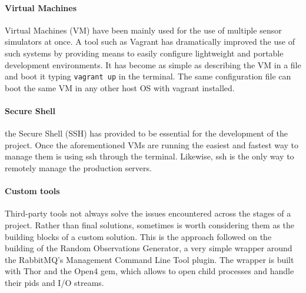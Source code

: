 \paragraph{Virtual Machines} Virtual Machines (VM) have been mainly used for the use of multiple sensor simulators at once. A tool such as Vagrant has dramatically improved the use of such systems by providing means to easily configure lightweight and portable development environments. It has become as simple as describing the VM in a file and boot it typing \texttt{vagrant up} in the terminal. The same configuration file can boot the same VM in any other host OS with vagrant installed.


\paragraph{Secure Shell} the Secure Shell (SSH) has provided to be essential for the development of the project. Once the aforementioned VMs are running the easiest and fastest way to manage them is using ssh through the terminal. Likewise, ssh is the only way to remotely manage the production servers.

\paragraph{Custom tools} Third-party tools not always solve the issues encountered across the stages of a project. Rather than final solutions, sometimes is worth considering them as the building blocks of a custom solution. This is the approach followed on the building of the Random Observations Generator, a very simple wrapper around the RabbitMQ's Management Command Line Tool plugin. The wrapper is built with Thor and the Open4 gem, which allows to open child processes and handle their pids and I/O streams.

